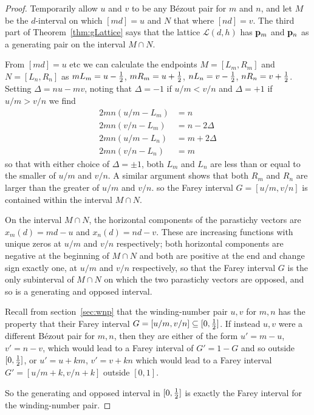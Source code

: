 \begin{proof}
	Temporarily allow $u$ and $v$ to be any B\'ezout pair for $m$ and $n$, and let  $M$ be the $d$-interval on which $[md]=u$ 
		and  $N$ that where $[nd]=v$. The third part of Theorem~\ref{thm:gLattice} says that the lattice $\mathcal{L}({d,h})$ has  ${\mathbf p}_{m}$ and ${\mathbf p}_{n}$ as a generating pair on the interval $M\cap N $. 
				

	From $[md]=u$ etc we can calculate the endpoints $M=[L_m,R_m]$ and $N=[L_n,R_n]$ as $m L_m=u-\textstyle{\frac{1}{2}}$, $mR_m=u+\textstyle{\frac{1}{2}}$, $n L_n=v-\textstyle{\frac{1}{2}}$, $n R_n=v+\textstyle{\frac{1}{2}}$. 	Setting $\Delta=n u - mv$, noting that $\Delta=-1$ if $u/m<v/n$ and $\Delta=+1$ if $u/m>v/n$  we find 
	\begin{align*}
		 2mn (u/m-L_m)& =n 
		 \\
		  2mn (v/n-L_m)& =n - 2\Delta
		 \\
		 	 2mn (u/m-L_n)& =m+2\Delta
				 \\
		 	 2mn (v/n-L_n)& =m
		\end{align*}
		so that with either choice of $\Delta=\pm 1$, both $L_m$ and $L_n$ are less than or equal to the smaller of $u/m$ and $v/n$.
		A similar argument shows that both $R_m$ and $R_n$ are larger than the greater of  $u/m$ and $v/n$.
		so the Farey interval $G=[u/m,v/n]$ is contained within the  interval $M\cap N $.
		
	On the interval  $M\cap N $, the horizontal components of the parastichy vectors are  $x_m(d)=md-u$ and $x_n(d)=nd-v$.  These are increasing functions with unique zeros at $u/m$ and $v/n$ respectively; both horizontal components are negative at the beginning of  $M\cap N$ and both are positive at the end and change sign exactly one, at  $u/m$ and $v/n$ respectively, so that the Farey interval $G$ is the only subinterval of $M\cap N$ on which the two parastichy vectors are opposed, and so is a generating and opposed interval.
				
	Recall from section~\ref{sec:wnp} that the winding-number pair $u, v$ for $m, n$ has the property that their Farey interval $G=[u/m,v/n]\subseteq[0,\textstyle{\frac{1}{2}}]$. If instead $u, v$ were a different B\'ezout pair for $m,n$, then they are either of the form $u'=m-u$, $v'=n-v$, which would lead to a Farey interval of $G'=1-G$ and so outside $[0,\textstyle{\frac{1}{2}}]$, or $u'=u+km$, $v'=v+kn$ which would lead to a Farey interval $G'=[u/m+k,v/n+k]$ outside $[0,1]$. 
	
	So the generating and opposed interval in  $[0,\textstyle{\frac{1}{2}}]$ is exactly the Farey interval for the winding-number pair. 
	
			
\end{proof}

